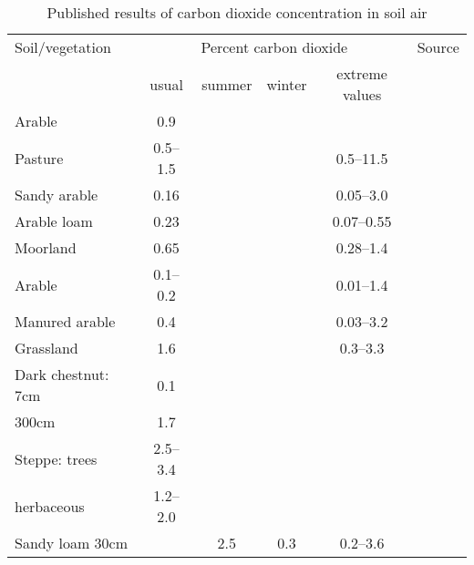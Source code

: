 \begin{table}[ht]
\small\addtolength{\tabcolsep}{-5pt}
\centering
\caption{Published results of carbon dioxide concentration in soil air \cite{white2018karst}}
\begin{tabular}{lccccc}
    \hline
    Soil/vegetation & \multicolumn{4}{c}{Percent carbon dioxide} & Source\\
    \cline{2-5}
    & usual & summer & winter & extreme values &\\
    \hline
    Arable                       & 0.9         &              &              &             & \cite{russell1973soil} \\
    Pasture                      & 0.5--1.5    &              &              & 0.5--11.5   & \cite{russell1973soil} \\
    Sandy arable                 & 0.16        &              &              & 0.05--3.0   & \cite{russell1973soil} \\
    Arable loam                  & 0.23        &              &              & 0.07--0.55  & \cite{russell1973soil} \\
    Moorland                     & 0.65        &              &              & 0.28--1.4   & \cite{russell1973soil} \\
    Arable                       & 0.1--0.2    &              &              & 0.01--1.4   & \cite{russell1973soil} \\
    Manured arable               & 0.4         &              &              & 0.03--3.2   & \cite{russell1973soil} \\
    Grassland                    & 1.6         &              &              & 0.3--3.3    & \cite{russell1973soil} \\
    Dark chestnut: 7cm           & 0.1         &              &              &             & \cite{chulakov1959} \\
    \hspace{27mm} 300cm          & 1.7         &              &              &             & \cite{chulakov1959} \\
    Steppe: trees                & 2.5--3.4    &              &              &             & \cite{matskevitch1957} \\
    \hspace{14mm} herbaceous     & 1.2--2.0    &              &              &             & \cite{matskevitch1957} \\
    Sandy loam 30cm              &             & 2.5          & 0.3          & 0.2--3.6    & \cite{gerstenhauer1969offene} \\

\end{tabular}
\end{table}
